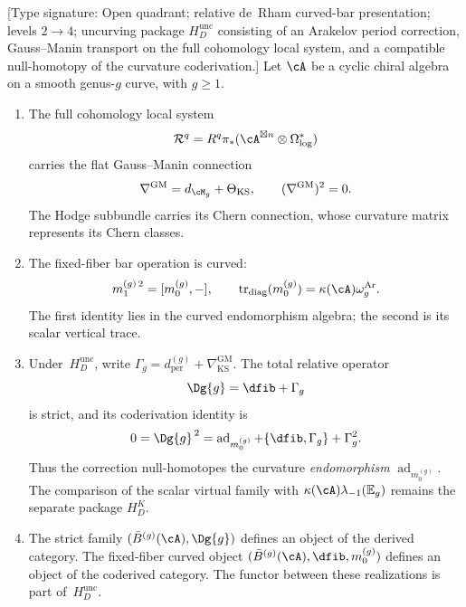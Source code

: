 \begin{proposition}
\label{prop:gauss-manin-uncurving-chain}
\textup{[Type signature: Open quadrant; relative de~Rham curved-bar
presentation; levels $2\to4$; uncurving package
$H_D^{\mathrm{unc}}$ consisting of an Arakelov period correction,
Gauss--Manin transport on the full cohomology local system, and a
compatible null-homotopy of the curvature coderivation.]}
Let $\cA$ be a cyclic chiral algebra on a smooth genus-$g$ curve,
with $g\geq1$.

\begin{enumerate}[label=\textup{(\roman*)}]
\item The full cohomology local system
\[
 \mathcal R^q
 =R^q\pi_*(\cA^{\boxtimes n}\otimes\Omega_{\log}^*)
\]
carries the flat Gauss--Manin connection
\begin{equation}\label{eq:gauss-manin-chain}
 \nabla^{\mathrm{GM}}
 =d_{\cM_g}+\Theta_{\mathrm{KS}},
 \qquad
 (\nabla^{\mathrm{GM}})^2=0.
\end{equation}
The Hodge subbundle carries its Chern connection, whose curvature
matrix represents its Chern classes.

\item The fixed-fiber bar operation is curved:
\[
 m_1^{(g)\,2}=[m_0^{(g)},-],
 \qquad
 \operatorname{tr}_{\mathrm{diag}}(m_0^{(g)})
 =\kappa(\cA)\omega_g^{\mathrm{Ar}}.
\]
The first identity lies in the curved endomorphism algebra; the second
is its scalar vertical trace.

\item Under~$H_D^{\mathrm{unc}}$, write
\(
 \Gamma_g=d_{\mathrm{per}}^{(g)}
 +\nabla_{\mathrm{KS}}^{\mathrm{GM}}
\).
The total relative operator
\[
 \Dg{g}=\dfib+\Gamma_g
\]
is strict, and its coderivation identity is
\begin{equation}\label{eq:chain-uncurving}
 0=\Dg{g}^{\,2}
 =\operatorname{ad}_{m_0^{(g)}}
 +\{\dfib,\Gamma_g\}+\Gamma_g^2.
\end{equation}
Thus the correction null-homotopes the curvature
\emph{endomorphism} $\operatorname{ad}_{m_0^{(g)}}$.  The comparison
of the scalar virtual family with
$\kappa(\cA)\lambda_{-1}(\mathbb E_g)$ remains the separate package
$H_D^K$.

\item The strict family
$(\bar B^{(g)}(\cA),\Dg{g})$ defines an object of the derived
category.  The fixed-fiber curved object
$(\bar B^{(g)}(\cA),\dfib,m_0^{(g)})$ defines an object of the
coderived category.  The functor between these realizations is part
of~$H_D^{\mathrm{unc}}$.
\end{enumerate}
\end{proposition}

